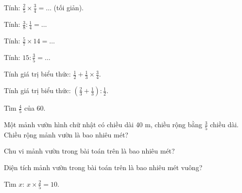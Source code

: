 \begin{ex}
Tính: $\frac{2}{5} \times \frac{3}{4} = \dots$ (tối giản).
\end{ex}

\begin{ex}
Tính: $\frac{3}{8} : \frac{1}{4} = \dots$
\end{ex}

\begin{ex}
Tính: $\frac{5}{7} \times 14 = \dots$
\end{ex}

\begin{ex}
Tính: $15 : \frac{3}{5} = \dots$
\end{ex}

\begin{ex}
Tính giá trị biểu thức: $\frac{1}{2} + \frac{1}{3} \times \frac{3}{4}$.
\end{ex}

\begin{ex}
Tính giá trị biểu thức: $(\frac{2}{3} + \frac{1}{3}) : \frac{1}{2}$.
\end{ex}

\begin{ex}
Tìm $\frac{4}{5}$ của 60.
\end{ex}

\begin{ex}
Một mảnh vườn hình chữ nhật có chiều dài 40 m, chiều rộng bằng $\frac{3}{5}$ chiều dài. Chiều rộng mảnh vườn là bao nhiêu mét?
\end{ex}

\begin{ex}
Chu vi mảnh vườn trong bài toán trên là bao nhiêu mét?
\end{ex}

\begin{ex}
Diện tích mảnh vườn trong bài toán trên là bao nhiêu mét vuông?
\end{ex}

\begin{ex}
Tìm $x$: $x \times \frac{2}{5} = 10$.
\end{ex}

